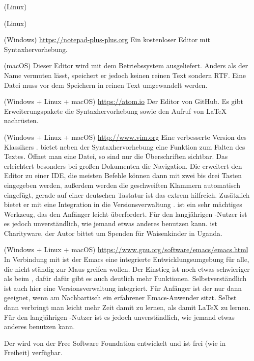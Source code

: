 \begin{labeling}{}
\item[\Program{kwrite}] (Linux) 

\item[\Program{kate}] (Linux)

\item[\Program{Notepad++}] (Windows) \url{https://notepad-plus-plus.org} Ein
  kostenloser Editor mit Syntaxhervorhebung.  

\item[\Program{TextEdit}]
  (macOS) Dieser Editor wird mit dem Betriebssystem ausgeliefert.  Anders
  als der Name vermuten lässt, speichert er jedoch keinen reinen Text
  sondern RTF.  Eine Datei muss vor dem Speichern in reinen Text umgewandelt
  werden.

\item[\Program{Atom}] (Windows + Linux + macOS)
  \url{https://atom.io} Der Editor von GitHub.  Es gibt Erweiterungspakete
  die Syntaxhervorhebung sowie den Aufruf von \LaTeX{} nachrüsten.

\item[\Program{Vim}] (Windows + Linux + macOS) \url{http://www.vim.org} Eine
  verbesserte Version des Klassikers .  bietet
  neben der Syntaxhervorhebung eine Funktion zum Falten des Textes. Öffnet
  man eine Datei, so sind nur die Überschriften sichtbar. Das erleichtert
  besonders bei großen Dokumenten die Navigation.  Die
   erweitert den Editor zu einer IDE, die meisten
  Befehle können dann mit zwei bis drei Tasten eingegeben werden, außerdem
  werden die geschweiften Klammern automatisch eingefügt, gerade auf einer
  deutschen Tastatur ist das extrem hilfreich.  Zusätzlich bietet er mit
   eine Integration in die Versionsverwaltung
  .   ist ein sehr mächtiges Werkzeug, das den
  Anfänger leicht überfordert.  Für den langjährigen -Nutzer
  ist es jedoch unverständlich, wie jemand etwas anderes benutzen kann.
   ist Charityware, der Autor bittet um Spenden für Waisenkinder in Uganda.

\item[\Program{Emacs}] (Windows + Linux + macOS) 
  \url{https://www.gnu.org/software/emacs/emacs.html} In Verbindung mit
   ist der Emacs eine integrierte Entwicklungsumgebung
  für alle, die nicht ständig zur Maus greifen wollen.  Der Einstieg ist
  noch etwas schwieriger als beim , dafür dafür gibt es auch
  deutlich mehr Funktionen. Selbstverständlich ist auch hier eine
  Versionsverwaltung integriert.  Für Anfänger ist der  nur
  dann geeignet, wenn am Nachbartisch ein erfahrener Emacs-Anwender sitzt.
  Selbst dann verbringt man leicht mehr Zeit damit  zu
  lernen, als damit \LaTeX{} zu lernen. Für den langjährigen 
  -Nutzer ist es jedoch unverständlich, 
  wie jemand etwas anderes benutzen kann.
  
  Der  wird von der Free Software Foundation entwickelt
  und ist frei (wie in Freiheit) verfügbar.
\end{labeling}

